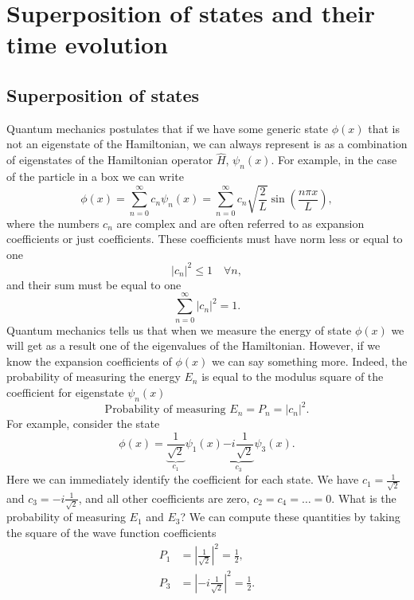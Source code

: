 \documentclass[../Main/chem331-notes.tex]{subfiles}
\begin{document}
\setcounter{section}{7}

\section{Superposition of states and their time evolution}
\subsection{Superposition of states}
Quantum mechanics postulates that if we have some generic state $\phi(x)$ that is not an eigenstate of the Hamiltonian, we can always represent is as a combination of eigenstates of the Hamiltonian operator $\hat{H}$, $\psi_n(x)$. For example, in the case of the particle in a box we can write
\begin{equation}
\label{eq:super:superposition}
\phi(x) = \sum_{n = 0}^\infty c_n \psi_n(x) = \sum_{n = 0}^\infty c_n \sqrt{\frac{2}{L}} \sin\left(\frac{n \pi x}{L}\right),
\end{equation}
where the numbers $c_n$ are complex and are often referred to as expansion coefficients or just coefficients.
These coefficients must have norm less or equal to one
\begin{equation}
|c_n|^2 \leq 1 \quad \forall n,
\end{equation}
and their sum must be equal to one
\begin{equation}
\sum_{n = 0}^\infty |c_n|^2 = 1.
\end{equation}
Quantum mechanics tells us that when we measure the energy of state $\phi(x)$ we will get as a result one of the eigenvalues of the Hamiltonian.
However, if we know the expansion coefficients of $\phi(x)$ we can say something more.
Indeed, the probability of measuring the energy $E_n$ is equal to the modulus square of the coefficient for eigenstate $\psi_n(x)$
\begin{equation}
\text{Probability of measuring } E_n = P_n = |c_n|^2.
\end{equation}
For example, consider the state
\begin{equation}
\phi(x) = \underbrace{\frac{1}{\sqrt{2}}}_{c_1} \psi_1(x) \underbrace{- i \frac{1}{\sqrt{2}}}_{c_3} \psi_3(x).
\end{equation}
Here we can immediately identify the coefficient for each state. We have $c_1 = \frac{1}{\sqrt{2}}$ and $c_3 = - i \frac{1}{\sqrt{2}}$, and all other coefficients are zero, $c_2 = c_4 = \ldots = 0$.
What is the probability of measuring $E_1$ and $E_3$? We can compute these quantities by taking the square of the wave function coefficients
\begin{equation}
\begin{split}
P_1 &= \left|\frac{1}{\sqrt{2}}\right|^2 = \frac{1}{2},\\
P_3 &= \left|-i\frac{1}{\sqrt{2}}\right|^2 = \frac{1}{2}.
\end{split}
\end{equation}
\end{document}

